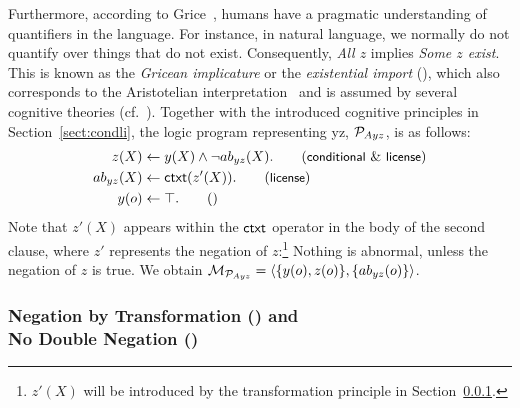 \documentclass[12pt]{article}
\begin{document}
Furthermore, according to Grice~\cite{grice1975}, humans have a pragmatic understanding of quantifiers in the language.
For instance, in natural language, we normally do not quantify over things that do not exist.
Consequently, \textit{All $z$} implies \textit{Some $z$ exist}.
This is known as the \textit{Gricean implicature} or the \textit{existential import} (),
which also corresponds to the Aristotelian interpretation~\cite{parry:1991} and is assumed by several cognitive theories (cf.~\cite{johnsonlaird:1983,Rips1994}). 
Together with the introduced cognitive principles in Section~\ref{sect:condli}, the logic program representing \MA yz, ${\cal P}_{Ayz}$, is as follows:
\begin{align} %
z(X) & \leftarrow  y(X) \wedge \neg \Ab_{yz}(X). 
\tag{\conditionals\ \&\ \licenses} \\
\Ab_{yz}(X) & \leftarrow \cxt(z'(X)). \tag{\licenses}\\
y(o) & \leftarrow \top. \tag{}
\end{align}
Note that $z'(X)$ appears within the $\mathsf{ctxt}$ operator in the body of the second clause, where $z'$ represents the negation of $z$:\footnote{$z'(X)$ will be introduced by the \footnotesize{\textsf{transformation}} principle in Section~\ref{sect:dneg}.}
Nothing is abnormal, unless the negation of $z$ is true.
We obtain \quad ${\cal M}_{{\cal P}_{Ayz}} = \langle \{y(o),z(o)\}, \{ab_{yz}(o)\} \rangle$.


\subsubsection{Negation by Transformation (\transformation) and \\No Double Negation (\dnegation)} \label{sect:dneg}
\end{document}

